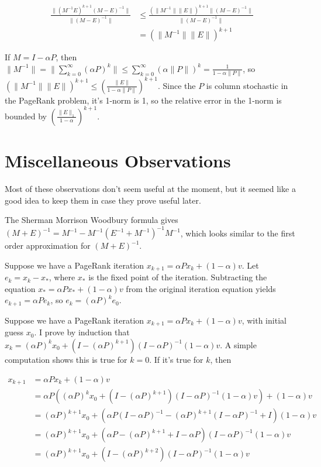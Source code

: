 \documentclass{article}
\newcommand \inv [1] {{#1}^{-1}} %
\begin{document}
\begin{align*}
\frac{\|(\inv M E)^{k+1}\inv{(M-E)}\|}{\|\inv{(M-E)}\|} &\leq \frac{(\|\inv M\|\| E\|)^{k+1}\|(M-E)^{-1}\|}{\|(M-E)^{-1}\|} \\
&= (\|\inv M\|\|E\|)^{k+1}
\end{align*}

If $M=I-\alpha P$, then $\|\inv M\| = \|\sum_{k=0}^\infty (\alpha P)^k\| \leq \sum_{k=0}^\infty (\alpha\| P\|)^k = \frac 1 {1-\alpha\|P\|}$, so $(\|\inv M\|\|E\|)^{k+1} \leq \left(\frac{\|E\|}{1-\alpha\|P\|}\right)^{k+1}$. Since the $P$ is column stochastic in the PageRank problem, it's 1-norm is 1, so the relative error in the 1-norm is bounded by $\left(\frac{\|E\|_1}{1-\alpha}\right)^{k+1}$.

\section{Miscellaneous Observations}

Most of these observations don't seem useful at the moment, but it seemed like a good idea to keep them in case they prove useful later.

The Sherman Morrison Woodbury formula gives $\inv{(M+E)}=\inv M-\inv M\inv{(\inv E+\inv M)}\inv M$, which looks similar to the first order approximation for $(M+E)^{-1}$.

Suppose we have a PageRank iteration $x_{k+1}=\alpha Px_k + (1-\alpha)v$. Let $e_k=x_k-x_*$, where $x_*$ is the fixed point of the iteration. Subtracting the equation $x_* = \alpha P x_* + (1-\alpha)v$ from the original iteration equation yields $e_{k+1}=\alpha P e_k$, so $e_k = (\alpha P)^k e_0$.

Suppose we have a PageRank iteration $x_{k+1}=\alpha Px_k + (1-\alpha)v$, with initial guess $x_0$. I prove by induction that $x_k = (\alpha P)^k x_0 + (I-(\alpha P)^{k+1})(I-\alpha P)^{-1} (1-\alpha)v$. A simple computation shows this is true for $k=0$. If it's true for $k$, then

\begin{align*}
x_{k+1} &= \alpha Px_k + (1-\alpha)v\\
&= \alpha P \left((\alpha P)^k x_0 + (I-(\alpha P)^{k+1})(I-\alpha P)^{-1} (1-\alpha)v\right) + (1-\alpha)v\\
&= (\alpha P)^{k+1}x_0+\left(\alpha P(I-\alpha P)^{-1}-(\alpha P)^{k+1}(I-\alpha P)^{-1} + I\right)(1-\alpha)v\\
&= (\alpha P)^{k+1}x_0 + (\alpha P - (\alpha P)^{k+1} + I-\alpha P)(I-\alpha P)^{-1}(1-\alpha)v\\
&= (\alpha P)^{k+1} x_0 + (I-(\alpha P)^{k+2})(I-\alpha P)^{-1} (1-\alpha)v
\end{align*}
\end{document}
